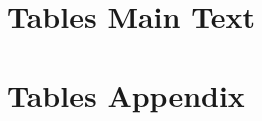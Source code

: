 \section{Tables Main Text}


\clearpage


\clearpage


\clearpage


\section*{Tables Appendix}


\clearpage


\clearpage


\clearpage


\clearpage


